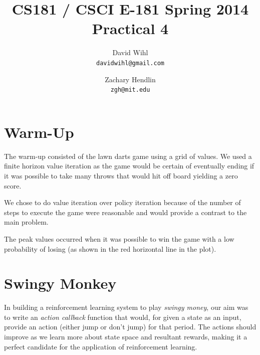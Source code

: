 \documentclass[11pt, oneside]{article}   	%
\title{CS181 / CSCI E-181 Spring 2014 Practical 4}
\author{
  David Wihl\\
  \texttt{davidwihl@gmail.com}
  \and
  Zachary Hendlin\\
  \texttt{zgh@mit.edu} 
}
\begin{document}
\maketitle
\section*{Warm-Up}

The warm-up consisted of the lawn darts game using a grid of values. We used a finite horizon value iteration as the game would be certain of eventually ending if it was possible to take many throws that would hit off board yielding a zero score.

We chose to do value iteration over policy iteration because of the number of steps to execute the game were reasonable and would provide a contrast to the main problem.

The peak values occurred when it was possible to win the game with a low probability of losing (as shown in the red horizontal line in the plot). 

\begin{figure}[h!]
  \centering
 \end{figure}

\section*{Swingy Monkey}
In building a reinforcement learning system to play \textit{swingy money}, our aim was to write an \textit{action callback} function that would, for given a state as an input, provide an action (either jump or don't jump) for that period. The actions should improve as we learn more about state space and resultant rewards, making it a perfect candidate for the application of reinforcement learning.
\end{document}
